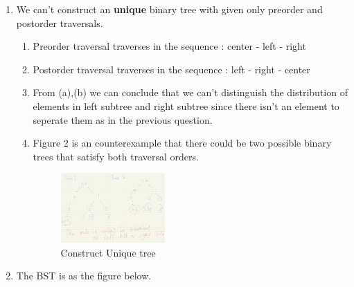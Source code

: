 \documentclass{article}
\begin{document}
\begin{CJK*}{UTF8}{bsmi}
\begin{enumerate}
    \item We can't construct an \textbf{unique} binary tree with given only preorder and postorder traversals.
    \begin{enumerate}
        \item Preorder traversal traverses in the sequence : center - left - right
        \item Postorder traversal traverses in the sequence : left - right - center 
        \item From (a),(b) we can conclude that we can't distinguish the distribution of elements in left subtree and right subtree since there isn't an element to seperate them as in the previous question.
        \item Figure 2 is an counterexample that there could be two possible binary trees that satisfy both traversal orders.
        \begin{figure}[h]
            \centering
            \includegraphics[width=0.4\textwidth]{IMG_0256.jpg}
            \caption{Construct Unique tree}
            \label{fig:my_label}
        \end{figure}

    \end{enumerate}
    \item The BST is as the figure below.
    \begin{figure}[h]
\end{figure}


\end{enumerate}
\end{CJK*}
\end{document}
